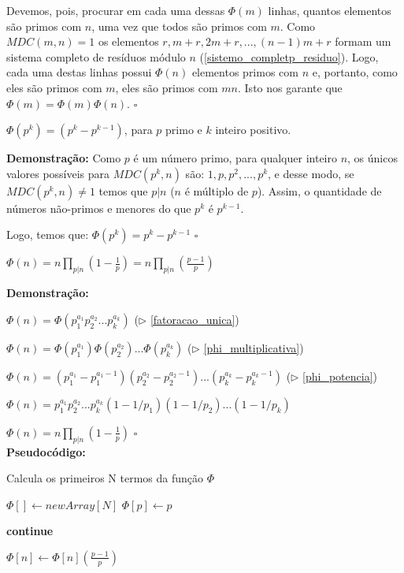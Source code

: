Devemos, pois, procurar em cada uma dessas $\Phi(m)$ linhas, quantos elementos são primos com $n$, uma vez que todos são primos com $m$. Como $MDC(m,n)=1$ os elementos $r,m+r,2m+r,...,(n-1)m+r$ formam um sistema completo de resíduos módulo $n$ (\autoref{sistemo_completp_residuo}).
Logo, cada uma destas linhas possui $\Phi(n)$ elementos primos com $n$ e, portanto, como eles são primos com $m$, eles são primos com $mn$. Isto nos garante que $\Phi(m) = \Phi(m)\Phi(n)$. $\square$


\begin{theorem}\label{phi_potencia}
$\Phi(p^k) = (p^k - p^{k-1})$, para $p$ primo e $k$ inteiro positivo.
\end{theorem}
\textbf{Demonstração:}
Como $p$ é um número primo, para qualquer inteiro $n$, os únicos valores possíveis para $MDC(p^k,n)$ são: $1, p, p^2,...,p^k$, 
e desse modo, se $MDC(p^k,n)\neq1$ temos que $p|n$ ($n$ é múltiplo de $p$). Assim, o quantidade de números não-primos e menores do que $p^k$ é $p^{k-1}$.

Logo, temos que: $\Phi(p^k) = p^k - p^{k-1}$ $\square$




\begin{theorem}
$\Phi(n) = n \prod_{p|n}(1 - \frac{1}{p}) = n \prod_{p|n}(\frac{p-1}{p})$
\end{theorem}
\textbf{Demonstração:}

$\Phi(n) = \Phi(p_1^{a_1}p_2^{a_2}...p_k^{a_k})$ ($\triangleright$ \autoref{fatoracao_unica})

$\Phi(n) = \Phi(p_1^{a_1})\Phi(p_2^{a_2})...\Phi(p_k^{a_k})$ ($\triangleright$ \autoref{phi_multiplicativa})

$\Phi(n) = (p_1^{a_1} - p_1^{a_1-1})(p_2^{a_2} - p_2^{a_2-1})...(p_k^{a_k} - p_k^{a_k-1})$ ($\triangleright$ \autoref{phi_potencia})

$\Phi(n) = p_1^{a_1}p_2^{a_2}...p_k^{a_k}(1 - 1/p_1)(1 - 1/p_2)...(1 - 1/p_k)$

$\Phi(n) = n \prod_{p|n}(1 - \frac{1}{p})$ $\square$\\

\textbf{Pseudocódigo:}
\begin{algorithm}
\caption{Calcula os primeiros N termos da função $\Phi$}
\begin{algorithmic}[1]
\State $\Phi[] \gets new Array[N]$
\State $\Phi[p] \gets p$
\EndFor


 
\State \textbf{continue}
\EndIf

\State $\Phi[n] \gets \Phi[n] (\frac{p-1}{p})$
\EndFor

\EndFor

\State \Return {$\Phi[]$}
\EndProcedure
\end{algorithmic}
\end{algorithm}


